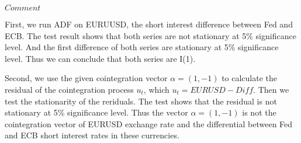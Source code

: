 \documentclass[11pt]{article}
\begin{document}
    \(Comment\)

First, we run ADF on EURUUSD, the short interest difference between Fed
and ECB. The test result shows that both series are not stationary at
5\% significance level. And the first difference of both series are
stationary at 5\% significance level. Thus we can conclude that both
series are I(1).

Second, we use the given cointegration vector \(\alpha=(1,-1)\) to
calculate the residual of the cointegration process \(u_t\), which
\(u_t=EURUSD-Diff\). Then we test the stationarity of the reriduals. The
test shows that the residual is not stationary at 5\% significance
level. Thus the vector \(\alpha=(1,-1)\) is not the cointegration vector
of EURUSD exchange rate and the differential between Fed and ECB short
interest rates in these currencies.


    
    
    
    
\end{document}
